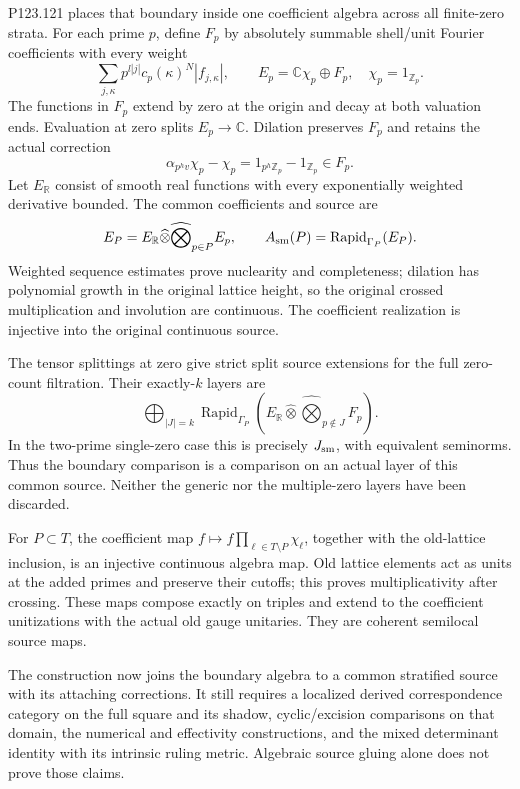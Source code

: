 P123.121 places that boundary inside one coefficient algebra across
all finite-zero strata. For each prime $p$, define $F_p$ by absolutely
summable shell/unit Fourier coefficients with every weight
\[
 \sum_{j,\kappa}p^{l|j|}c_p(\kappa)^N|f_{j,\kappa}|,
 \qquad E_p=\mathbb C\chi_p\oplus F_p,
 \quad \chi_p=1_{\mathbb Z_p}.
\]
The functions in $F_p$ extend by zero at the origin and decay at both
valuation ends. Evaluation at zero splits $E_p\to\mathbb C$.
Dilation preserves $F_p$ and retains the actual correction
\[
 \alpha_{p^h v}\chi_p-\chi_p
       =1_{p^h\mathbb Z_p}-1_{\mathbb Z_p}\in F_p.
\]
Let $E_{\mathbb R}$ consist of smooth real functions with every
exponentially weighted derivative bounded. The common coefficients and
source are
\[
 E_P=E_{\mathbb R}\widehat\otimes\widehat\bigotimes_{p\in P}E_p,
 \qquad A_{\rm sm}(P)=\operatorname{Rapid}_{\Gamma_P}(E_P).
\]
Weighted sequence estimates prove nuclearity and completeness; dilation
has polynomial growth in the original lattice height, so the original
crossed multiplication and involution are continuous. The coefficient
realization is injective into the original continuous source.

The tensor splittings at zero give strict split source extensions
for the full zero-count filtration. Their exactly-$k$ layers are
\[
 \bigoplus_{|J|=k}\operatorname{Rapid}_{\Gamma_P}
 \left(E_{\mathbb R}\widehat\otimes
       \widehat\bigotimes_{p\notin J}F_p\right).
\]
In the two-prime single-zero case this is precisely $J_{\rm sm}$,
with equivalent seminorms. Thus the boundary comparison is a comparison
on an actual layer of this common source. Neither the generic nor the
multiple-zero layers have been discarded.

For $P\subset T$, the coefficient map
$f\mapsto f\prod_{\ell\in T\setminus P}\chi_\ell$, together with the
old-lattice inclusion, is an injective continuous algebra map. Old
lattice elements act as units at the added primes and preserve their
cutoffs; this proves multiplicativity after crossing. These maps compose
exactly on triples and extend to the coefficient unitizations with the
actual old gauge unitaries. They are coherent semilocal source maps.

The construction now joins the boundary algebra to a common stratified
source with its attaching corrections. It still requires a localized
derived correspondence category on the full square and its shadow,
cyclic/excision comparisons on that domain, the numerical and effectivity
constructions, and the mixed determinant identity with its intrinsic
ruling metric. Algebraic source gluing alone does not prove those claims.

